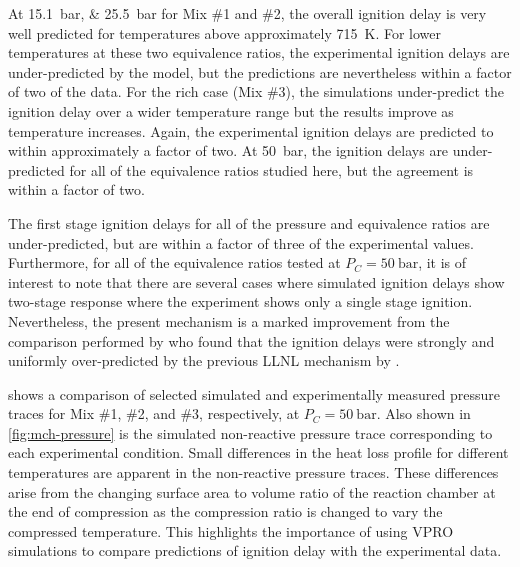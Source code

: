\documentclass[12pt, letterpaper]{article}
\begin{document}
At \SIlist{15.1;25.5}{\bar} for Mix \#1 and \#2, the overall ignition delay is very
well predicted for temperatures above approximately \SI{715}{\kelvin}. For lower
temperatures at these two equivalence ratios, the experimental ignition delays
are under-predicted by the model, but the predictions are nevertheless within
a factor of two of the data. For the rich case (Mix \#3), the simulations
under-predict the ignition delay over a wider temperature range but the results
improve as temperature increases. Again, the experimental ignition delays are
predicted to within approximately a factor of two. At \SI{50}{\bar}, the ignition
delays are under-predicted for all of the equivalence ratios studied here, but
the agreement is within a factor of two.

The first stage ignition delays for all of the pressure and equivalence ratios
are under-predicted, but are within a factor of three of the experimental
values. Furthermore, for all of the equivalence ratios tested at $P_C=\SI{50}{\bar}$,
it is of interest to note that there are several cases where simulated ignition
delays show two-stage response where the experiment shows only a single stage
ignition. Nevertheless, the present mechanism is a marked improvement from the
comparison performed by \textcite{Mittal2009} who found that the ignition
delays were strongly and uniformly over-predicted by the previous LLNL
mechanism by \textcite{Pitz2007}.

 shows a comparison of selected simulated and
experimentally measured pressure traces for Mix \#1, \#2, and \#3,
respectively, at $P_C=\SI{50}{\bar}$. Also shown in \autoref{fig:mch-pressure} is the
simulated non-reactive pressure trace corresponding to each experimental
condition. Small differences in the heat loss profile for different
temperatures are apparent in the non-reactive pressure traces. These
differences arise from the changing surface area to volume ratio of the
reaction chamber at the end of compression as the compression ratio is changed
to vary the compressed temperature. This highlights the importance of using
VPRO simulations to compare predictions of ignition delay with the experimental data.
\end{document}
